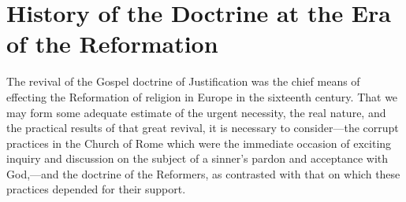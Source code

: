 \documentclass[
]{book}
\begin{document}
\hypertarget{history-of-the-doctrine-at-the-era-of-the-reformation}{%
\chapter{History of the Doctrine at the Era of the Reformation}\label{history-of-the-doctrine-at-the-era-of-the-reformation}}

The revival of the Gospel doctrine of Justification was the chief means of effecting the Reformation of religion in Europe in the sixteenth century. That we may form some adequate estimate of the urgent necessity, the real nature, and the practical results of that great revival, it is necessary to consider---the corrupt practices in the Church of Rome which were the immediate occasion of exciting inquiry and discussion on the subject of a sinner's pardon and acceptance with God,---and the doctrine of the Reformers, as contrasted with that on which these practices depended for their support.
\end{document}
